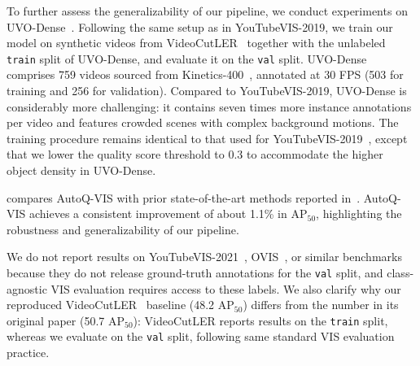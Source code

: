 To further assess the generalizability of our pipeline, we conduct experiments on UVO-Dense~\cite{uvo}. Following the same setup as in YouTubeVIS-2019, we train our model on synthetic videos from VideoCutLER~\cite{videocutler} together with the unlabeled \texttt{train} split of UVO-Dense, and evaluate it on the \texttt{val} split. UVO-Dense comprises 759 videos sourced from Kinetics-400~\cite{kay2017kinetics}, annotated at 30 FPS (503 for training and 256 for validation). Compared to YouTubeVIS-2019, UVO-Dense is considerably more challenging: it contains seven times more instance annotations per video and features crowded scenes with complex background motions. The training procedure remains identical to that used for YouTubeVIS-2019~\cite{ytvis2019}, except that we lower the quality score threshold to 0.3 to accommodate the higher object density in UVO-Dense.

 compares AutoQ-VIS with prior state-of-the-art methods reported in~\cite{uvo}. AutoQ-VIS achieves a consistent improvement of about 1.1\% in $\text{AP}_{50}$, highlighting the robustness and generalizability of our pipeline.


We do not report results on YouTubeVIS-2021~\cite{ytvis2019}, OVIS~\cite{ovis}, or similar benchmarks because they do not release ground-truth annotations for the \texttt{val} split, and class-agnostic VIS evaluation requires access to these labels. We also clarify why our reproduced VideoCutLER~\cite{videocutler} baseline (48.2 ${\text{AP}}_{50}$) differs from the number in its original paper (50.7 ${\text{AP}}_{50}$): VideoCutLER reports results on the \texttt{train} split, whereas we evaluate on the \texttt{val} split, following same standard VIS evaluation practice.